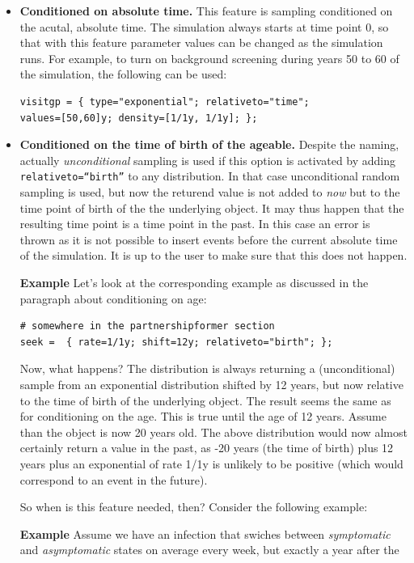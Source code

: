 \documentclass[11pt]{article}
\newenvironment{example}{\par\smallskip\noindent\begingroup\small\textbf{\small Example\enskip}}{\endgroup\par\smallskip}
\begin{document}
\begin{itemize}
\item\textbf{Conditioned on absolute time.} This feature is sampling
conditioned on the acutal, absolute time. The simulation always starts at time
point $0$, so that with this feature parameter values can be changed as the
simulation runs. For example, to turn on background screening during years 50
to 60 of the simulation, the following can be used:
\begin{verbatim}
visitgp = { type="exponential"; relativeto="time";
values=[50,60]y; density=[1/1y, 1/1y]; };
\end{verbatim}

\item\textbf{Conditioned on the time of birth of the ageable.} Despite the
naming, actually \emph{unconditional} sampling is used if this option is
activated by adding \texttt{relativeto=``birth''} to any distribution. In that
case unconditional random sampling is used, but now the returend value is not
added to \emph{now} but to the time point of birth of the the underlying object.
It may thus happen that the resulting time point is a time point in the past. In
this case an error is thrown as it is not possible to insert events before the
current absolute time of the simulation. It is up to the user to make sure that
this does not happen.
\begin{example}
Let's look at the corresponding example as discussed in the paragraph about
conditioning on age:
\begin{verbatim}
# somewhere in the partnershipformer section
seek =  { rate=1/1y; shift=12y; relativeto="birth"; };
\end{verbatim}
Now, what happens? The distribution is always returning a (unconditional) sample
from an exponential distribution shifted by 12 years, but now relative to the
time of birth of the underlying object. The result seems the same as for
conditioning on the age. This is true until the age of 12 years. Assume than
the object is now 20 years old. The above distribution would now almost
certainly return a value in the past, as -20 years (the time of birth) plus 12
years plus an exponential of rate 1/1y is unlikely to be positive (which would
correspond to an event in the future).
\end{example}
So when is this feature needed, then? Consider the following example:
\begin{example} Assume
we have an infection that swiches between \emph{symptomatic} and
\emph{asymptomatic} states on average every week, but exactly a year after the

\end{example}
\end{itemize}
\end{document}

